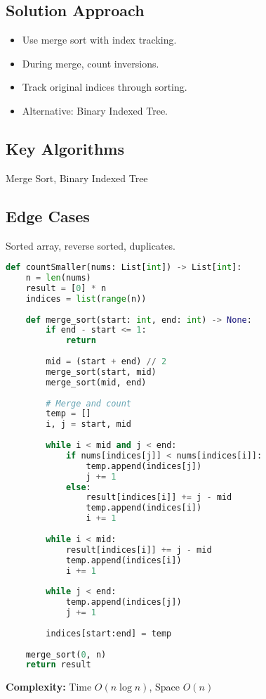 \documentclass[10pt, a4paper]{article}
\begin{document}
\subsection*{Solution Approach}
\begin{itemize}
    \item Use merge sort with index tracking.
    \item During merge, count inversions.
    \item Track original indices through sorting.
    \item Alternative: Binary Indexed Tree.
\end{itemize}

\subsection*{Key Algorithms}
Merge Sort, Binary Indexed Tree

\subsection*{Edge Cases}
Sorted array, reverse sorted, duplicates.

\begin{lstlisting}[language=Python]
def countSmaller(nums: List[int]) -> List[int]:
    n = len(nums)
    result = [0] * n
    indices = list(range(n))
    
    def merge_sort(start: int, end: int) -> None:
        if end - start <= 1:
            return
        
        mid = (start + end) // 2
        merge_sort(start, mid)
        merge_sort(mid, end)
        
        # Merge and count
        temp = []
        i, j = start, mid
        
        while i < mid and j < end:
            if nums[indices[j]] < nums[indices[i]]:
                temp.append(indices[j])
                j += 1
            else:
                result[indices[i]] += j - mid
                temp.append(indices[i])
                i += 1
        
        while i < mid:
            result[indices[i]] += j - mid
            temp.append(indices[i])
            i += 1
        
        while j < end:
            temp.append(indices[j])
            j += 1
        
        indices[start:end] = temp
    
    merge_sort(0, n)
    return result
\end{lstlisting}
\textbf{Complexity:} Time $O(n \log n)$, Space $O(n)$
\end{document}
